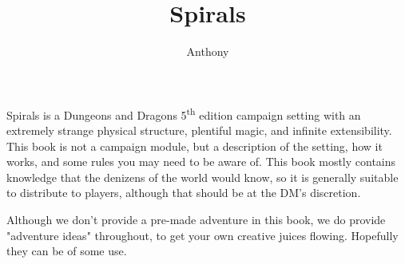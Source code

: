 \documentclass[a4paper]{book}
\title{Spirals}
\author{Anthony \censor{Super}}
\begin{document}
\setcounter{tocdepth}{1}
\maketitle


Spirals is a Dungeons and Dragons 5\textsuperscript{th} edition campaign setting with an extremely strange physical structure, plentiful magic, and infinite extensibility.
This book is not a campaign module, but a description of the setting, how it works, and some rules you may need to be aware of.
This book mostly contains knowledge that the denizens of the world would know, so it is generally suitable to distribute to players, although that should be at the DM's discretion.

Although we don't provide a pre-made adventure in this book, we do provide "adventure ideas" throughout, to get your own creative juices flowing.
Hopefully they can be of some use.

\listoftodos
\tableofcontents 











\printindex
\end{document}

